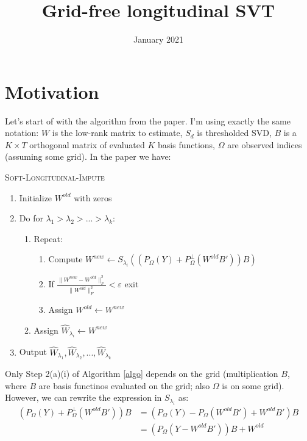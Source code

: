 \documentclass{article}
\title{Grid-free longitudinal SVT}
\author{ }
\date{January 2021}
\begin{document}
\maketitle

\section{Motivation}

Let's start of with the algorithm from the paper. I'm using exactly the same notation: $W$ is the low-rank matrix to estimate, $S_d$ is thresholded SVD, $B$ is a $K \times T$ orthogonal matrix of evaluated $K$ basis functions, $\Omega$ are observed indices (assuming some grid). In the paper we have:

\begin{algorithm}\label{algo}
\caption{\textsc{Soft-Longitudinal-Impute}\label{alg:soft-impute}}
\begin{enumerate}
\item Initialize $W^{old}$ with zeros
\item Do for $\lambda_1 > \lambda_2 > ... > \lambda_k$:
\begin{enumerate}
\item Repeat:
\begin{enumerate}
\item Compute $W^{new} \leftarrow S_{\lambda_i}( (P_\Omega(Y) + P_\Omega^\perp(W^{old}B'))B )$
\item If $\frac{\|W^{new} - W^{old}\|_F^2}{\|W^{old}\|_F^2} < \varepsilon$ exit
\item Assign $W^{old} \leftarrow W^{new}$
\end{enumerate}
\item Assign $\hat{W}_{\lambda_i} \leftarrow W^{new}$
\end{enumerate}
\item Output $\hat{W}_{\lambda_1}, \hat{W}_{\lambda_2}, ... , \hat{W}_{\lambda_k}$
\end{enumerate}
\end{algorithm}

Only Step 2(a)(i) of Algorithm \ref{algo} depends on the grid (multiplication $B$, where $B$ are basis functinos evaluated on the grid; also $\Omega$ is on some grid). However, we can rewrite the expression in $S_{\lambda_i}$ as:
\begin{align}
(P_\Omega(Y) + P_\Omega^\perp(W^{old}B'))B &= (P_\Omega(Y) - P_\Omega(W^{old}B') + W^{old}B')B\nonumber\\
&= (P_\Omega(Y - W^{old}B'))B + W^{old}\label{eq:rearrangement}
\end{align}
\end{document}
